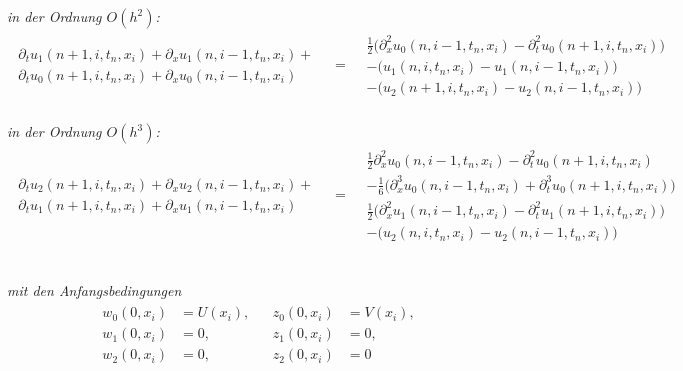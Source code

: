 \noindent \emph{in der Ordnung $O(h^2)$:}
{\small
\begin{align}\label{eq:transport:kleineta:oh2}
\begin{split}
\partial_t u_1(n+1, i, t_n, x_i) + \partial_x u_1(n, i-1, t_n, x_i) +\\
\partial_t u_0(n+1, i, t_n, x_i) + \partial_x u_0(n, i-1, t_n, x_i)
\end{split}
&=
\begin{split}
&\frac{1}{2} \bigl( \partial^2_x u_0(n, i-1, t_n, x_i) - \partial^2_t u_0(n+1,i, t_n, x_i)\bigr)\\
&- \bigl( u_1(n, i, t_n, x_i) - u_1(n, i-1, t_n, x_i) \bigr)\\
&- \bigl( u_2(n+1, i, t_n, x_i) - u_2(n, i-1, t_n, x_i) \bigr)
\end{split}
\end{align}
}\\

\noindent \emph{in der Ordnung $O(h^3)$:}
{\small
\begin{align}\label{eq:transport:kleineta:oh3}
\begin{split}
\partial_t u_2(n+1, i, t_n, x_i) + \partial_x u_2(n, i-1, t_n, x_i) +\\
\partial_t u_1(n+1, i, t_n, x_i) + \partial_x u_1(n, i-1, t_n, x_i)
\end{split}
&=
\begin{split}
&\frac{1}{2} \partial^2_x u_0(n, i-1, t_n, x_i) - \partial^2_t u_0(n+1,i, t_n, x_i)\\
&- \frac{1}{6}\bigl(\partial^3_x u_0(n, i-1, t_n, x_i) + \partial^3_t u_0(n+1,i, t_n, x_i) \bigr)\\
&\frac{1}{2} \bigl( \partial^2_x u_1(n, i-1, t_n, x_i) - \partial^2_t u_1(n+1,i, t_n, x_i) \bigr)\\
&- \bigl( u_2(n, i, t_n, x_i) - u_2(n, i-1, t_n, x_i) \bigr)
\end{split}
\end{align}\\
}

\emph{mit den Anfangsbedingungen}
\begin{align}\label{eq:transport:kleineta:anfangsbedinungen}
\begin{split}
w_0(0, x_i) &= U(x_i),\\
w_1(0, x_i) &= 0,\\
w_2(0, x_i) &= 0,
\end{split}&
\begin{split}
z_0(0, x_i) &= V(x_i),\\
z_1(0, x_i) &= 0,\\
z_2(0, x_i) &= 0
\end{split}
\end{align}

